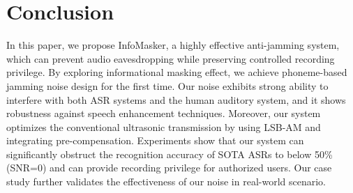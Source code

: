 \section{Conclusion}
\label{sec:conclusion}

In this paper, we propose InfoMasker, a highly effective anti-jamming system, which can prevent audio eavesdropping while preserving controlled recording privilege. By exploring informational masking effect, we achieve phoneme-based jamming noise design for the first time. Our noise exhibits strong ability to interfere with both ASR systems and the human auditory system, and it shows robustness against speech enhancement techniques. Moreover, our system optimizes the conventional ultrasonic transmission by using LSB-AM and integrating pre-compensation. Experiments show that our system can significantly obstruct the recognition accuracy of SOTA ASRs to below 50\% (SNR=0) and can provide recording privilege for authorized users. Our case study further validates the effectiveness of our noise in real-world scenario.  